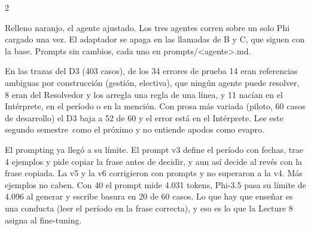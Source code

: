 \documentclass[9pt,a4paper]{extarticle}
\newcommand{\seccion}[1]{\vspace{0.6mm}{\bfseries\footnotesize\color{acento}\MakeUppercase{#1}}\par\nobreak\vspace{0.4mm}\nobreak}
\newcommand{\q}{\textquotedbl}
\newcommand{\cod}[1]{{\ttfamily\small #1}}
\begin{document}
\begin{multicols}{2}
\begin{center}
\end{center}

{\footnotesize\color{gris} Relleno naranjo, el agente ajustado. Los tres agentes corren sobre
un solo Phi cargado una vez. El adaptador se apaga en las llamadas de B y C, que siguen con la
base. Prompts sin cambios, cada uno en \cod{prompts/<agente>.md}.\par}

\seccion{Por qué el Intérprete y por qué fine-tuning}

{\footnotesize
En las trazas del D3 (403 casos), de los 34 errores de prueba 14 eran referencias ambiguas por
construcción (\q gestión\q, \q electiva\q), que ningún agente puede resolver, 8 eran del
Resolvedor y los arregla una regla de una línea, y 11 nacían en el Intérprete, en el período o en
la mención. Con prosa más variada (piloto, 60 casos de desarrollo) el D3 baja a 52 de 60 y el
error está en el Intérprete. Lee \q este segundo semestre\q\ como el próximo y no entiende apodos
como \q evapro\q.

El prompting ya llegó a su límite. El prompt v3 define el período con fechas, trae 4 ejemplos y
pide copiar la frase antes de decidir, y aun así decide al revés con la frase copiada. La v5 y la
v6 corrigieron con prompts y no superaron a la v4. Más ejemplos no caben. Con 40 el prompt mide
4.031 tokens, Phi-3.5 pasa su límite de 4.096 al generar y escribe basura en 20 de 60 casos. Lo
que hay que enseñar es una conducta (leer el período en la frase correcta), y eso es lo que la
Lecture 8 asigna al fine-tuning.\par}


\end{multicols}
\end{document}
